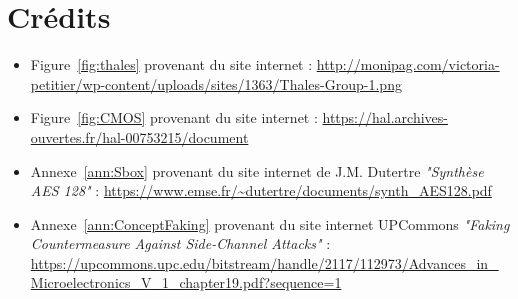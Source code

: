 \documentclass[oneside]{book}
\makeatletter
\newcommand{\dummy@addcontentsline}[3]{}
\newcommand{\DeactivateToc}{\let\addcontentsline\dummy@addcontentsline}
\makeatother
\begin{document}
\newpage
\section*{Crédits}

\begin{itemize}

\item Figure~\ref{fig:thales} provenant du site internet :
\url{http://monipag.com/victoria-petitier/wp-content/uploads/sites/1363/Thales-Group-1.png}

\item Figure~\ref{fig:CMOS} provenant du site internet :
\url{https://hal.archives-ouvertes.fr/hal-00753215/document}

\item Annexe~\ref{ann:Sbox} provenant du site internet de J.M. Dutertre \textit{"Synthèse AES 128"} :
\url{https://www.emse.fr/~dutertre/documents/synth_AES128.pdf}

\item Annexe~\ref{ann:ConceptFaking} provenant du site internet UPCommons \textit{"Faking Countermeasure Against Side-Channel Attacks"} :
\url{https://upcommons.upc.edu/bitstream/handle/2117/112973/Advances_in_Microelectronics_V_1_chapter19.pdf?sequence=1}

\end{itemize}


{}

\nocite{*}




\newpage
\lhead{}
\DeactivateToc
\end{document}
